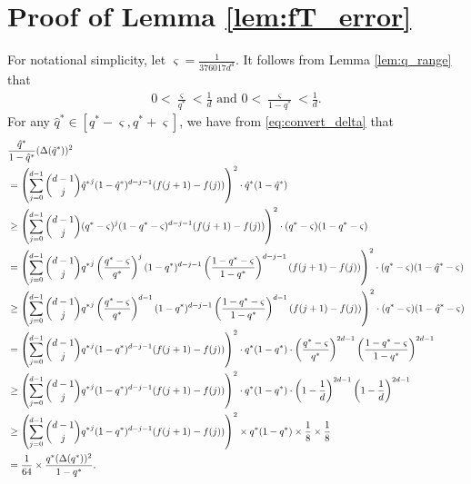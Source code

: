 \documentclass[onecolumn,letterpaper]{IEEEtran}
\newcommand{\cp}{{q}}
\newcommand{\cpn}{{\cp^*}}
\newcommand{\pgapn}{{\Delta(\cpn)}}
\newcommand{\cph}{{\hat{\cp}^*}}
\newcommand{\pgaph}{{\Delta(\cph)}}
\begin{document}
\section{Proof of Lemma \ref{lem:fT_error}}
\label{app:lem_fT_error}
For notational simplicity, let $\varsigma=\frac{1}{376017d^4}$. It follows from Lemma \ref{lem:q_range} that 
\begin{align}
    0<\frac {\varsigma}{\cpn} < \frac{1}{d} \text{ and  }    0< \frac {\varsigma}{1-\cpn} <  \frac{1}{d}.
\end{align}
For any $\cph \in \left[ \cpn-\varsigma , \cpn+\varsigma \right]$, we have from \eqref{eq:convert_delta} that 
\begin{align}
    &\frac{\cph }{1-\cph}(\pgaph)^2 \notag\\
    &= \left( \sum\limits_{j=0}^{d-1} \binom{d-1}{j} \cph^j (1-\cph)^{d-j-1} ( f(j+1) - f(j) ) \right)^2 \cdot \cph (1-\cph) \notag\\
    &\ge \left( \sum\limits_{j=0}^{d-1} \binom{d-1}{j} (\cpn-\varsigma)^j (1-\cpn-\varsigma)^{d-j-1} ( f(j+1) - f(j) ) \right)^2 \cdot (\cpn-\varsigma) (1-\cpn-\varsigma)  \notag\\
    &= \left( \sum\limits_{j=0}^{d-1} \binom{d-1}{j} \cpn^j\left(\frac{\cpn-\varsigma}{\cpn}\right)^j (1-\cpn)^{d-j-1}\left(\frac{1-\cpn-\varsigma}{1-\cpn}\right)^{d-j-1} ( f(j+1) - f(j) ) \right)^2 \cdot (\cpn-\varsigma) (1-\cph-\varsigma)  \notag\\
    &\geq \left( \sum\limits_{j=0}^{d-1} \binom{d-1}{j} \cpn^j\left(\frac{\cpn-\varsigma}{\cpn}\right)^{d-1} (1-\cpn)^{d-j-1}\left(\frac{1-\cpn-\varsigma}{1-\cpn}\right)^{d-1} ( f(j+1) - f(j) ) \right)^2 \cdot (\cpn-\varsigma) (1-\cph-\varsigma)  \notag\\
    &=\left( \sum\limits_{j=0}^{d-1} \binom{d-1}{j} \cpn^j (1-\cpn)^{d-j-1} ( f(j+1) - f(j) ) \right)^2 \cdot \cpn (1-\cpn) \cdot \left( \frac{\cpn-\varsigma}{\cpn} \right)^{2d-1} \left( \frac{1-\cpn-\varsigma}{1-\cpn} \right)^{2d-1} \notag\\
    &\ge \left( \sum\limits_{j=0}^{d-1} \binom{d-1}{j} \cpn^j (1-\cpn)^{d-j-1} ( f(j+1) - f(j) ) \right)^2 \cdot \cpn (1-\cpn) \cdot \left( 1 - \frac{1}{d} \right)^{2d-1} \left( 1 - \frac{1}{d} \right)^{2d-1} \notag\\ 
    &\ge \left( \sum\limits_{j=0}^{d-1} \binom{d-1}{j} \cpn^j (1-\cpn)^{d-j-1} ( f(j+1) - f(j) ) \right)^2 \times \cpn (1-\cpn) \times \frac{1}{8}\times \frac{1}{8} \notag\\ 
    &= \frac{1}{64} \times \frac{\cpn (\pgapn)^2}{1-\cpn}. \label{eq:pgaph}
\end{align}
\end{document}
